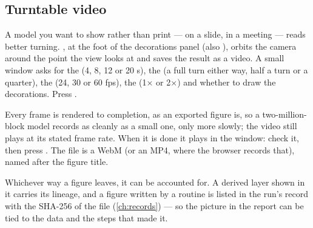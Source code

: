 \subsection{Turntable video}\label{sec:figures-turntable}

A model you want to show rather than print — on a slide, in a meeting — reads better turning. , at the foot of the decorations panel (also ), orbits the camera around the point the view looks at and saves the result as a video. A small window asks for the  (4, 8, 12 or 20 s), the  (a full turn either way, half a turn or a quarter), the  (24, 30 or 60 fps), the  (1× or 2×) and whether to draw the decorations. Press .

Every frame is rendered to completion, as an exported figure is, so a two-million-block model records as cleanly as a small one, only more slowly; the video still plays at its stated frame rate. When it is done it plays in the window: check it, then press . The file is a WebM (or an MP4, where the browser records that), named after the figure title.

Whichever way a figure leaves, it can be accounted for. A derived layer shown in it carries its lineage, and a figure written by a routine is listed in the run's record with the SHA-256 of the file (\cref{ch:records}) — so the picture in the report can be tied to the data and the steps that made it.
